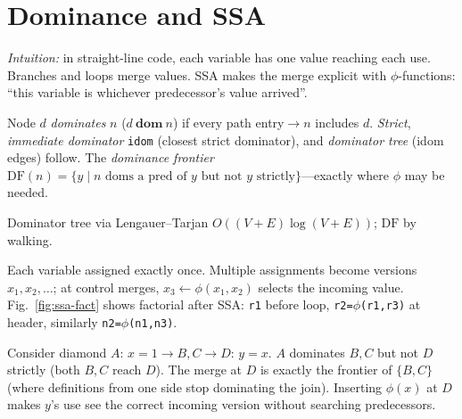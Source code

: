 \section{Dominance and SSA}
\label{sec:ssa}
\emph{Intuition:} in straight-line code, each variable has one value reaching each use. Branches and loops merge values. SSA makes the merge explicit with $\phi$-functions: ``this variable is whichever predecessor's value arrived''.

\begin{definition}[Dominance]
Node $d$ \emph{dominates} $n$ ($d\ \mathbf{dom}\ n$) if every path entry$\to n$ includes $d$. \emph{Strict}, \emph{immediate dominator} \texttt{idom} (closest strict dominator), and \emph{dominator tree} (idom edges) follow. The \emph{dominance frontier} $\text{DF}(n)=\{y\mid n\text{ doms a pred of }y\text{ but not }y\text{ strictly}\}$---exactly where $\phi$ may be needed.
\end{definition}
Dominator tree via Lengauer--Tarjan $O((V+E)\log(V+E))$; $\text{DF}$ by walking.

\begin{definition}[SSA]
Each variable assigned exactly once. Multiple assignments become versions $x_1,x_2,\dots$; at control merges, $x_3\gets\phi(x_1,x_2)$ selects the incoming value. Fig.~\ref{fig:ssa-fact} shows factorial after SSA: \texttt{r1} before loop, \texttt{r2=$\phi$(r1,r3)} at header, similarly \texttt{n2=$\phi$(n1,n3)}.
\end{definition}

\begin{example}
Consider diamond $A\texttt{: }x=1 \to B,C \to D\texttt{: }y=x$. $A$ dominates $B,C$ but not $D$ strictly (both $B,C$ reach $D$). The merge at $D$ is exactly the frontier of $\{B,C\}$ (where definitions from one side stop dominating the join). Inserting $\phi(x)$ at $D$ makes $y$'s use see the correct incoming version without searching predecessors.
\end{example}

